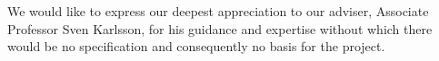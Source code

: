 We would like to express our deepest appreciation to our adviser, Associate
Professor Sven Karlsson, for his guidance and expertise without which there
would be no \thename{} specification and consequently no basis for the project.

